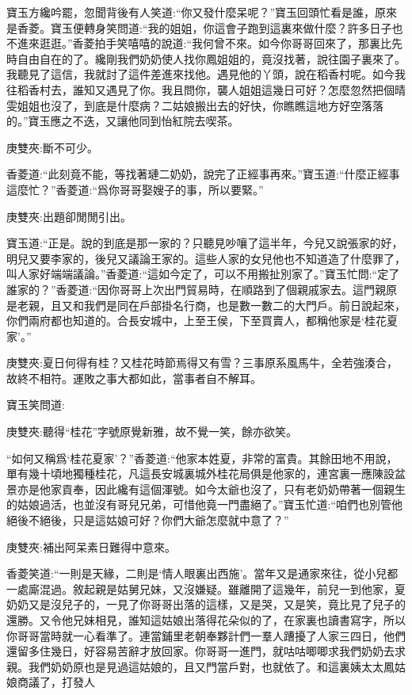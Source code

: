 \begin{parag}
    寶玉方纔吟罷，忽聞背後有人笑道:“你又發什麼呆呢？”寶玉回頭忙看是誰，原來是香菱。寶玉便轉身笑問道:“我的姐姐，你這會子跑到這裏來做什麼？許多日子也不進來逛逛。”香菱拍手笑嘻嘻的說道:“我何曾不來。如今你哥哥回來了，那裏比先時自由自在的了。纔剛我們奶奶使人找你鳳姐姐的，竟沒找著，說往園子裏來了。我聽見了這信，我就討了這件差進來找他。遇見他的丫頭，說在稻香村呢。如今我往稻香村去，誰知又遇見了你。我且問你，襲人姐姐這幾日可好？怎麼忽然把個晴雯姐姐也沒了，到底是什麼病？二姑娘搬出去的好快，你瞧瞧這地方好空落落的。”寶玉應之不迭，又讓他同到怡紅院去喫茶。\begin{note}庚雙夾:斷不可少。\end{note}香菱道:“此刻竟不能，等找著璉二奶奶，說完了正經事再來。”寶玉道:“什麼正經事這麼忙？”香菱道:“爲你哥哥娶嫂子的事，所以要緊。”\begin{note}庚雙夾:出題卻閒閒引出。\end{note}寶玉道:“正是。說的到底是那一家的？只聽見吵嚷了這半年，今兒又說張家的好，明兒又要李家的，後兒又議論王家的。這些人家的女兒他也不知道造了什麼罪了，叫人家好端端議論。”香菱道:“這如今定了，可以不用搬扯別家了。”寶玉忙問:“定了誰家的？”香菱道:“因你哥哥上次出門貿易時，在順路到了個親戚家去。這門親原是老親，且又和我們是同在戶部掛名行商，也是數一數二的大門戶。前日說起來，你們兩府都也知道的。合長安城中，上至王侯，下至買賣人，都稱他家是‘桂花夏家’。”\begin{note}庚雙夾:夏日何得有桂？又桂花時節焉得又有雪？三事原系風馬牛，全若強湊合，故終不相符。運敗之事大都如此，當事者自不解耳。\end{note}寶玉笑問道:\begin{note}庚雙夾:聽得“桂花”字號原覺新雅，故不覺一笑，餘亦欲笑。\end{note}“如何又稱爲‘桂花夏家’？”香菱道:“他家本姓夏，非常的富貴。其餘田地不用說，單有幾十頃地獨種桂花，凡這長安城裏城外桂花局俱是他家的，連宮裏一應陳設盆景亦是他家貢奉，因此纔有這個渾號。如今太爺也沒了，只有老奶奶帶著一個親生的姑娘過活，也並沒有哥兒兄弟，可惜他竟一門盡絕了。”寶玉忙道:“咱們也別管他絕後不絕後，只是這姑娘可好？你們大爺怎麼就中意了？”\begin{note}庚雙夾:補出阿呆素日難得中意來。\end{note}香菱笑道:“一則是天緣，二則是‘情人眼裏出西施’。當年又是通家來往，從小兒都一處廝混過。敘起親是姑舅兄妹，又沒嫌疑。雖離開了這幾年，前兒一到他家，夏奶奶又是沒兒子的，一見了你哥哥出落的這樣，又是哭，又是笑，竟比見了兒子的還勝。又令他兄妹相見，誰知這姑娘出落得花朵似的了，在家裏也讀書寫字，所以你哥哥當時就一心看準了。連當鋪里老朝奉夥計們一羣人蹧擾了人家三四日，他們還留多住幾日，好容易苦辭才放回家。你哥哥一進門，就咕咕唧唧求我們奶奶去求親。我們奶奶原也是見過這姑娘的，且又門當戶對，也就依了。和這裏姨太太鳳姑娘商議了，打發人
\end{parag}
